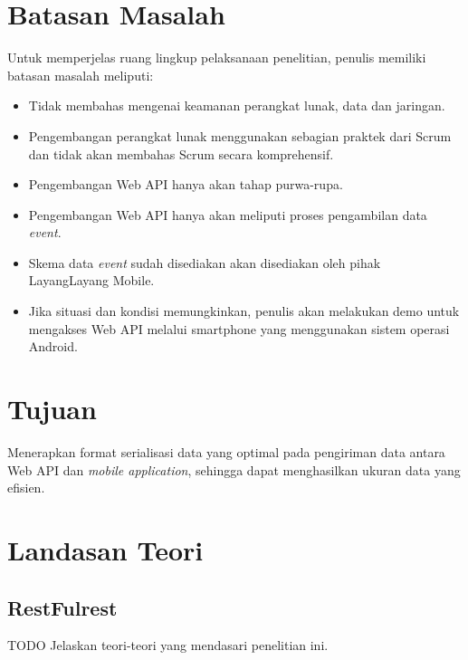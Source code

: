 \documentclass[a4paper, 12pt]{report}
\begin{document}
\section*{Batasan Masalah}
\onehalfspacing Untuk memperjelas ruang lingkup pelaksanaan penelitian, penulis memiliki batasan masalah meliputi:
\onehalfspacing
\begin{itemize}
  \item Tidak membahas mengenai keamanan perangkat lunak, data dan jaringan.
  \item Pengembangan perangkat lunak menggunakan sebagian praktek dari Scrum dan tidak akan membahas Scrum secara komprehensif.
  \item Pengembangan Web API hanya akan tahap purwa-rupa.
  \item Pengembangan Web API hanya akan meliputi proses pengambilan data \textit{event}.
  \item Skema data \textit{event} sudah disediakan akan disediakan oleh pihak LayangLayang Mobile.
  \item Jika situasi dan kondisi memungkinkan, penulis akan melakukan demo untuk mengakses Web API melalui smartphone yang menggunakan sistem operasi Android.
\end{itemize}

\section*{Tujuan}
\onehalfspacing 
Menerapkan format serialisasi data yang optimal pada pengiriman data antara Web API dan \textit{mobile application}, sehingga dapat menghasilkan ukuran data yang efisien.

\section*{Landasan Teori}
\onehalfspacing
\subsection*{RestFulrest}
\begin{flushleft}
TODO Jelaskan teori-teori yang mendasari penelitian ini.
\end{flushleft}
\end{document}
